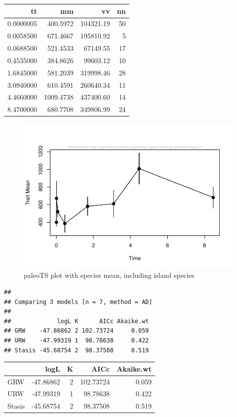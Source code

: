 \documentclass[]{article}
\begin{document}
\begin{longtable}[]{@{}rrrr@{}}
\toprule
tt & mm & vv & nn\tabularnewline
\midrule
\endhead
0.0000005 & 400.5972 & 104321.19 & 50\tabularnewline
0.0058500 & 671.4667 & 195810.92 & 5\tabularnewline
0.0688500 & 521.4533 & 67149.55 & 17\tabularnewline
0.4535000 & 384.8626 & 99603.12 & 10\tabularnewline
1.6845000 & 581.2039 & 319998.46 & 28\tabularnewline
3.0940000 & 610.4591 & 260640.34 & 11\tabularnewline
4.4660000 & 1009.4738 & 437400.60 & 14\tabularnewline
8.4700000 & 680.7708 & 349806.99 & 24\tabularnewline
\bottomrule
\end{longtable}

\begin{figure}[htbp]
\centering
\includegraphics{MA_JJ_files/figure-latex/paleoTS plot with species mean, including island species-1.pdf}
\caption{paleoTS plot with species mean, including island species}
\end{figure}

\begin{verbatim}
## 
## Comparing 3 models [n = 7, method = AD]
## 
##             logL K      AICc Akaike.wt
## GRW    -47.86862 2 102.73724     0.059
## URW    -47.99319 1  98.78638     0.422
## Stasis -45.68754 2  98.37508     0.519
\end{verbatim}

\begin{longtable}[]{@{}lrrrr@{}}
\toprule
& logL & K & AICc & Akaike.wt\tabularnewline
\midrule
\endhead
GRW & -47.86862 & 2 & 102.73724 & 0.059\tabularnewline
URW & -47.99319 & 1 & 98.78638 & 0.422\tabularnewline
Stasis & -45.68754 & 2 & 98.37508 & 0.519\tabularnewline
\bottomrule
\end{longtable}
\end{document}
